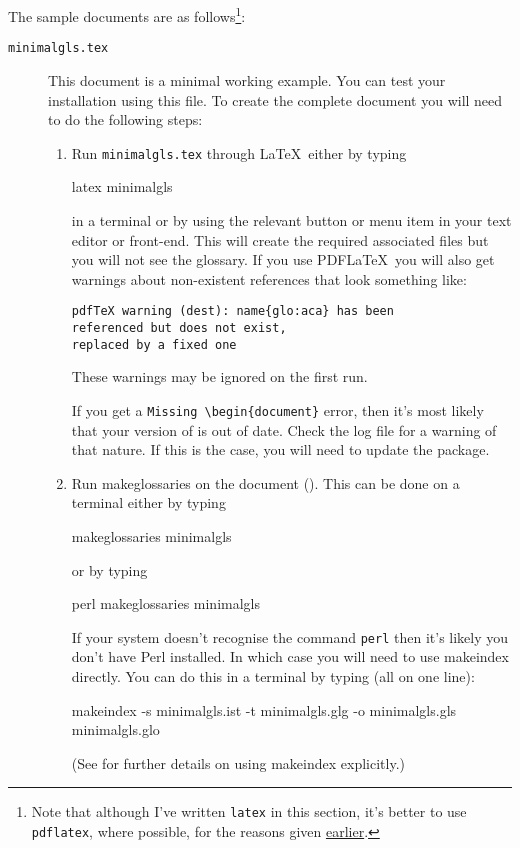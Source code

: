 \documentclass[report,inlinetitle]{nlctdoc}
\newcounter{sample}
\newcommand{\exitem}[2][sample]{%
  \item[\texttt{#1#2.tex}]%
  \refstepcounter{sample}\label{ex:#1#2}}
\newenvironment{samplelist}%
{\begin{description}}%
{\end{description}}
\begin{document}
The sample documents are as follows\footnote{Note that although I've written
\texttt{latex} in this section, it's better to use \texttt{pdflatex}, where
possible, for the reasons given \hyperlink{pdflatexnote}{earlier}.}:
\begin{samplelist}
\exitem[minimal]{gls} This document is a
minimal working example. You can test your installation using this
file. To create the complete document you will need to do the
following steps:
  \begin{enumerate}
  \item Run \texttt{minimalgls.tex} through \LaTeX\ either by 
  typing
\begin{prompt}
latex minimalgls
\end{prompt}
  in a terminal or by using the relevant button or menu item in
  your text editor or front-end. This will create the required 
  associated files but you will not see the glossary. If you use 
  PDF\LaTeX\ you will also get warnings about non-existent 
  references that look something like:
\begin{verbatim}
pdfTeX warning (dest): name{glo:aca} has been 
referenced but does not exist, 
replaced by a fixed one
\end{verbatim}
  These warnings may be ignored on the first run.

  If you get a \verb"Missing \begin{document}" error, then 
  it's most likely that your version of  is 
  out of date. Check the log file for a warning of that nature. 
  If this is the case, you will need to update the 
  package.

  \item Run \gls{makeglossaries} on the document (). This can
  be done on a terminal either by typing
\begin{prompt}
makeglossaries minimalgls
\end{prompt}
  or by typing
\begin{prompt}
perl makeglossaries minimalgls
\end{prompt}
  If your system doesn't recognise the command \texttt{perl} then
  it's likely you don't have Perl installed. In which case you
  will need to use \gls{makeindex} directly. You can do this
  in a terminal by typing (all on one line):
\begin{prompt}
makeindex -s minimalgls.ist -t minimalgls.glg -o minimalgls.gls minimalgls.glo
\end{prompt}
  (See  for further details on using 
   \gls*{makeindex} explicitly.)


\end{enumerate}
\end{samplelist}
\end{document}
